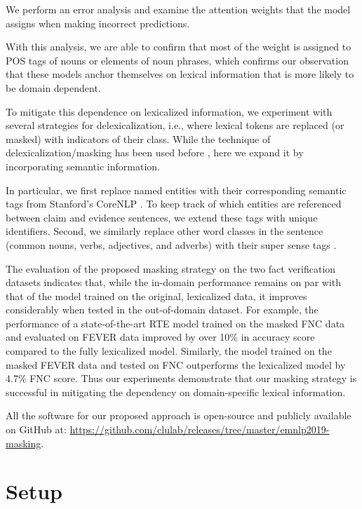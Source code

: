  {} We perform an error analysis and examine the attention weights that the model  assigns when making incorrect predictions.

 With this analysis, we are able to confirm that most of the weight is assigned to POS tags of nouns or elements of noun phrases, which confirms our observation that these models anchor themselves on lexical information that is more likely to be domain dependent.

{} To mitigate this dependence on lexicalized information, we experiment with several strategies for delexicalization, i.e., where lexical tokens are replaced (or masked) with indicators of their class. While the technique of delexicalization/masking has been used before \citep[e.g.,]{zeman2008cross}, here we expand it by incorporating semantic information.




In particular, we first replace named entities with their corresponding semantic tags from Stanford's CoreNLP \citep{manning2014stanford}.
To keep track of which entities are referenced between claim and evidence sentences, we extend these tags with unique identifiers.
%
Second, we similarly replace other word classes in the sentence (common nouns, verbs, adjectives, and adverbs)  with their super sense tags \citep{ciaramita2003supersense}.



{}  The evaluation of the proposed masking strategy on the two fact verification datasets indicates that,
while the in-domain performance remains on par with that of the model trained on the original, lexicalized data, it improves considerably when tested in the out-of-domain dataset.
For example, the performance of a state-of-the-art RTE model trained on the masked FNC data and evaluated on FEVER data improved by over 10\% in accuracy score compared to the fully lexicalized model. Similarly, the model trained on the masked FEVER data and tested on FNC outperforms the lexicalized model by 4.7\% FNC score.
Thus our experiments demonstrate that our masking strategy is successful in mitigating the dependency on domain-specific lexical information.

All the software for our proposed approach is open-source and publicly available on GitHub at: \url{https://github.com/clulab/releases/tree/master/emnlp2019-masking}.



\section{Setup}


